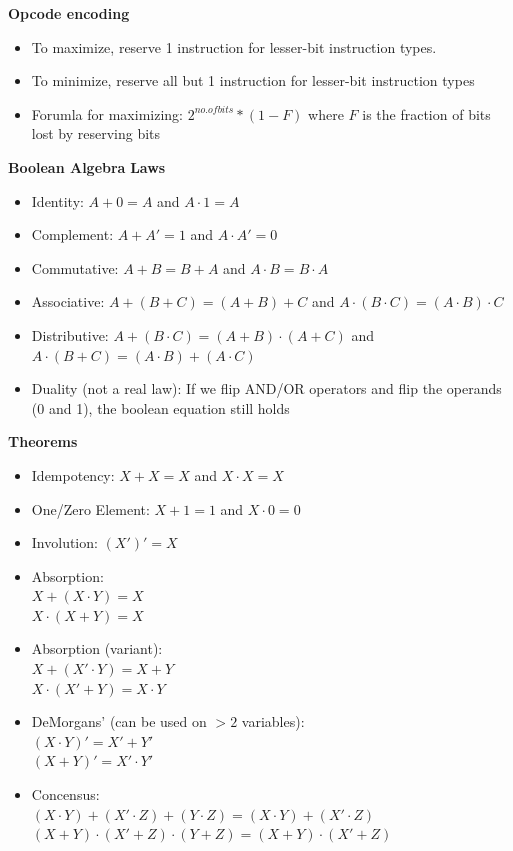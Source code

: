 \documentclass[a4paper]{article} \usepackage[backend=biber, style=numeric, sorting=none]{biblatex}
\begin{document}
\begin{multicols*}{4}
\textbf{Opcode encoding}
\begin{itemize}[leftmargin=*]
\itemsep -0.5em
\item To maximize, reserve 1 instruction for lesser-bit instruction types.
\item To minimize, reserve all but 1 instruction for lesser-bit instruction types
\item Forumla for maximizing: $2^{no. of bits} * (1 - F)$ where $F$ is the fraction of bits lost by reserving bits
\end{itemize}

{\small\textbf{Boolean Algebra}}
\textbf{Laws}
\begin{itemize}[leftmargin=*]
\itemsep -0.5em
\item Identity: $A + 0 = A$ and $A \cdot 1 = A$
\item Complement: $A + A' = 1$ and $A \cdot A' = 0$
\item Commutative: $A + B = B + A$  and $A \cdot B = B \cdot A$
\item Associative: $A + (B + C) = (A + B) + C$ and $A \cdot (B \cdot C) = (A \cdot B) \cdot C$
\item Distributive: $A + (B \cdot C) = (A + B) \cdot (A + C)$ and $A \cdot (B + C) = (A \cdot B) + (A \cdot C)$
\item Duality (not a real law): If we flip AND/OR operators and flip the operands (0 and 1), the boolean equation still holds
\end{itemize}

\textbf{Theorems}
\begin{itemize}[leftmargin=*]
\itemsep -0.5em
\item Idempotency: $X + X = X$ and $X \cdot X = X$
\item One/Zero Element: $X + 1 = 1$ and $X \cdot 0 = 0$
\item Involution: $(X')' = X$ 
\item Absorption: \\ $X + (X \cdot Y) = X$ \\ $X \cdot (X + Y) = X$
\item Absorption (variant): \\ $X + (X' \cdot Y) = X + Y$ \\ $X \cdot (X' + Y) = X \cdot Y$
\item DeMorgans' (can be used on $>2$ variables): \\ $(X \cdot Y)' = X' + Y'$ \\ $(X + Y)' = X' \cdot Y'$
\item Concensus: \\ $(X \cdot Y) + (X' \cdot Z) + (Y \cdot Z) = (X \cdot Y) + (X' \cdot Z)$ \\ $(X + Y) \cdot (X' + Z) \cdot (Y + Z) = (X + Y) \cdot (X' + Z)$
\end{itemize}


\end{multicols*}
\end{document}
